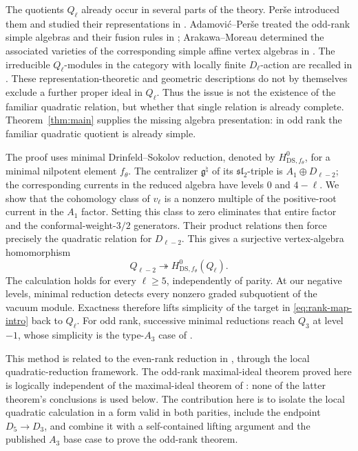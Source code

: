 \documentclass[11pt]{article}
\newcommand{\g}{\mathfrak g}
\begin{document}
The quotients $Q_\ell$ already occur in several parts of the theory.
Per\v{s}e introduced them and studied their representations in
\cite{PerseD}.  Adamovi\'c--Per\v{s}e treated the odd-rank simple algebras
and their fusion rules in \cite{AdamovicPerseFusion}; Arakawa--Moreau
determined the associated varieties of the corresponding simple affine vertex
algebras in \cite[\S9]{ArakawaMoreau}.
The irreducible $Q_\ell$-modules in the category with locally finite
$D_\ell$-action are recalled in \cite[Proposition~8.1]{AKMPP}.
These representation-theoretic and geometric descriptions do not by
themselves exclude a further proper ideal in $Q_\ell$.
Thus the issue is not the existence of the familiar quadratic relation,
but whether that single relation is already complete.
Theorem~\ref{thm:main} supplies the missing algebra presentation: in odd
rank the familiar quadratic quotient is already simple.

The proof uses minimal Drinfeld--Sokolov reduction, denoted by
$H^0_{\mathrm{DS},f_\theta}$, for a minimal nilpotent element $f_\theta$.
The centralizer $\g^\natural$ of its $\mathfrak{sl}_2$-triple is
$A_1\oplus D_{\ell-2}$; the corresponding currents in the reduced algebra
have levels $0$ and $4-\ell$.  We show that the cohomology class of
$v_\ell$ is a nonzero multiple of the positive-root current in the
$A_1$ factor.  Setting this class to zero eliminates that entire factor
and the conformal-weight-$3/2$ generators.  Their product relations then
force precisely the quadratic relation for $D_{\ell-2}$.  This gives a
surjective vertex-algebra homomorphism
\begin{equation}\label{eq:rank-map-intro}
 Q_{\ell-2}\twoheadrightarrow H^0_{\mathrm{DS},f_\theta}(Q_\ell).
\end{equation}
The calculation holds for every $\ell\ge5$, independently of parity.
At our negative levels, minimal reduction detects every nonzero graded
subquotient of the vacuum module.  Exactness therefore lifts simplicity of
the target in \eqref{eq:rank-map-intro} back to $Q_\ell$.
For odd rank, successive minimal reductions reach $Q_3$ at level $-1$, whose simplicity is
the type-$A_3$ case of \cite[Theorem~7.2]{ArakawaMoreau}.

This method is related to the even-rank reduction in \cite[\S8]{JinAM},
through the local quadratic-reduction framework.  The odd-rank
maximal-ideal theorem proved here is logically independent of the
maximal-ideal theorem of \cite{JinAM}: none of the latter theorem's
conclusions is used below.  The contribution here is to isolate the local
quadratic calculation in a form valid in both parities, include the endpoint
$D_5\to D_3$, and combine it with a self-contained lifting argument and the
published $A_3$ base case to prove the odd-rank theorem.
\end{document}
